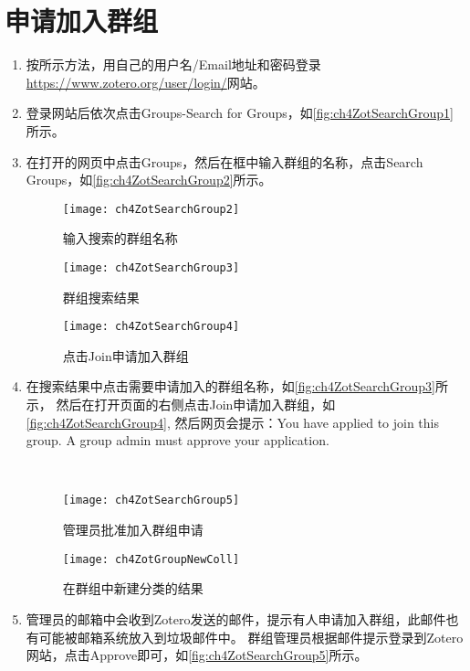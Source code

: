 \documentclass[cn,11pt,chinese]{elegantbook}
\begin{document}
\section{申请加入群组}\label{sec:joinGroup}
\begin{enumerate}
	\item 按所示方法，用自己的用户名/Email地址和密码登录\url{https://www.zotero.org/user/login/}网站。
	\item 登录网站后依次点击Groups-Search for Groups，如\autoref{fig:ch4ZotSearchGroup1}所示。
	\item 在打开的网页中点击Groups，然后在框中输入群组的名称，点击Search Groups，如\autoref{fig:ch4ZotSearchGroup2}所示。
	
	
	\begin{figure}[t]
		\begin{minipage}[b]{\dimexpr.3\textwidth-1em}
			\centering
			\texttt{[image: ch4ZotSearchGroup2]}
			\caption{输入搜索的群组名称}
			\label{fig:ch4ZotSearchGroup2}
		\end{minipage}
		\begin{minipage}[b]{\dimexpr.3\textwidth-1em}
			\centering
			\texttt{[image: ch4ZotSearchGroup3]}
			\caption{群组搜索结果}
			\label{fig:ch4ZotSearchGroup3}
		\end{minipage}
		\begin{minipage}[b]{\dimexpr.4\textwidth-1em}
			\centering
			\texttt{[image: ch4ZotSearchGroup4]}
			\caption{点击Join申请加入群组}
			\label{fig:ch4ZotSearchGroup4}
		\end{minipage}
	
	\end{figure}
	\item 在搜索结果中点击需要申请加入的群组名称，如\autoref{fig:ch4ZotSearchGroup3}所示，
	然后在打开页面的右侧点击Join申请加入群组，如\autoref{fig:ch4ZotSearchGroup4},
	然后网页会提示：You have applied to join this group. A group admin must approve your application.
		\begin{figure}[htbp]
			\centering\
			\begin{minipage}[t]{0.6\linewidth}
				\centering
				\texttt{[image: ch4ZotSearchGroup5]}
				\caption{管理员批准加入群组申请}
				\label{fig:ch4ZotSearchGroup5}
			\end{minipage}
			\begin{minipage}[t]{0.3\linewidth}
				\centering
				\texttt{[image: ch4ZotGroupNewColl]}
				\caption{在群组中新建分类的结果}
				\label{fig:ch4ZotGroupNewColl}
			\end{minipage}
		\end{figure}

	\item 管理员的邮箱中会收到Zotero发送的邮件，提示有人申请加入群组，此邮件也有可能被邮箱系统放入到垃圾邮件中。
	群组管理员根据邮件提示登录到Zotero网站，点击Approve即可，如\autoref{fig:ch4ZotSearchGroup5}所示。

\end{enumerate}
\end{document}
